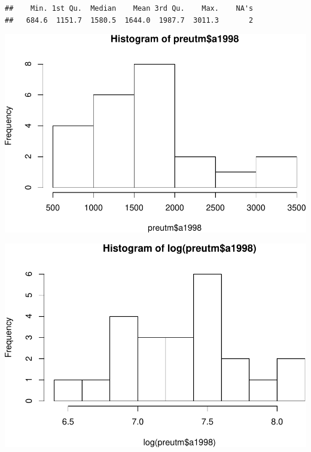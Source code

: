 \documentclass[11pt,]{article}
\newenvironment{Shaded}{\begin{snugshade}}{\end{snugshade}}
\newcommand{\KeywordTok}[1]{\textcolor[rgb]{0.13,0.29,0.53}{\textbf{#1}}}
\newcommand{\OperatorTok}[1]{\textcolor[rgb]{0.81,0.36,0.00}{\textbf{#1}}}
\newcommand{\NormalTok}[1]{#1}
\begin{document}
\begin{verbatim}
##    Min. 1st Qu.  Median    Mean 3rd Qu.    Max.    NA's 
##   684.6  1151.7  1580.5  1644.0  1987.7  3011.3       2
\end{verbatim}

\begin{Shaded}
\end{Shaded}

\includegraphics[width=600px]{proyecto_files/figure-latex/esda-1998-1}

\begin{Shaded}
\end{Shaded}

\includegraphics[width=600px]{proyecto_files/figure-latex/esda-1998-2}
\end{document}
